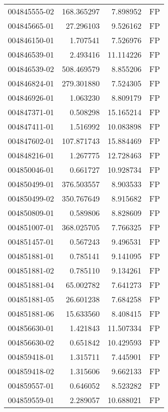 \begin{tabular}{lrrl}
004845555-02 &  168.365297 &       7.898952 &   FP \\
004845665-01 &   27.296103 &       9.526162 &   FP \\
004846150-01 &    1.707541 &       7.526976 &   FP \\
004846539-01 &    2.493416 &      11.114226 &   FP \\
004846539-02 &  508.469579 &       8.855206 &   FP \\
004846824-01 &  279.301880 &       7.524305 &   FP \\
004846926-01 &    1.063230 &       8.809179 &   FP \\
004847371-01 &    0.508298 &      15.165214 &   FP \\
004847411-01 &    1.516992 &      10.083898 &   FP \\
004847602-01 &  107.871743 &      15.884469 &   FP \\
004848216-01 &    1.267775 &      12.728463 &   FP \\
004850046-01 &    0.661727 &      10.928734 &   FP \\
004850499-01 &  376.503557 &       8.903533 &   FP \\
004850499-02 &  350.767649 &       8.915682 &   FP \\
004850809-01 &    0.589806 &       8.828609 &   FP \\
004851007-01 &  368.025705 &       7.766325 &   FP \\
004851457-01 &    0.567243 &       9.496531 &   FP \\
004851881-01 &    0.785141 &       9.141095 &   FP \\
004851881-02 &    0.785110 &       9.134261 &   FP \\
004851881-04 &   65.002782 &       7.641273 &   FP \\
004851881-05 &   26.601238 &       7.684258 &   FP \\
004851881-06 &   15.633560 &       8.408415 &   FP \\
004856630-01 &    1.421843 &      11.507334 &   FP \\
004856630-02 &    0.651842 &      10.429593 &   FP \\
004859418-01 &    1.315711 &       7.445901 &   FP \\
004859418-02 &    1.315606 &       9.662133 &   FP \\
004859557-01 &    0.646052 &       8.523282 &   FP \\
004859559-01 &    2.289057 &      10.688021 &   FP \\

\end{tabular}
